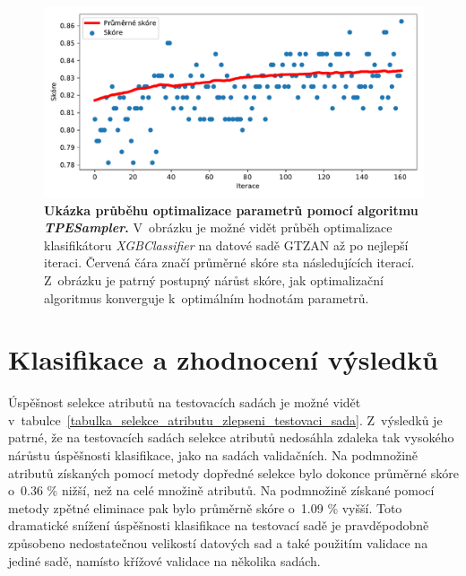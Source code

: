 \begin{figure}[h]
    \centering
    \includegraphics[width=\textwidth]{obrazky/TPESampler_optimisation.pdf}
    \caption{\textbf{Ukázka průběhu optimalizace parametrů pomocí algoritmu \textit{TPESampler}.} V~obrázku je možné vidět průběh optimalizace klasifikátoru \textit{XGBClassifier} na datové sadě GTZAN až po nejlepší iteraci. Červená čára značí průměrné skóre sta následujících iterací. Z~obrázku je patrný postupný nárůst skóre, jak optimalizační algoritmus konverguje k~optimálním hodnotám parametrů.}
    \label{obr_TPE_optimalizace}
\end{figure}

\chapter{Klasifikace a zhodnocení výsledků}
\label{klasifikace_a_zhodnoceni_vysledku}

Úspěšnost selekce atributů na testovacích sadách je možné vidět v~tabulce~\ref{tabulka_selekce_atributu_zlepseni_testovaci_sada}. Z~výsledků je patrné, že na testovacích sadách selekce atributů nedosáhla zdaleka tak vysokého nárůstu úspěšnosti klasifikace, jako na sadách validačních. Na podmnožině atributů získaných pomocí metody dopředné selekce bylo dokonce průměrné skóre o~0.36 \% nižší, než na celé množině atributů. Na podmnožině získané pomocí metody zpětné eliminace pak bylo průměrně skóre o~1.09 \% vyšší. Toto dramatické snížení úspěšnosti klasifikace na testovací sadě je pravděpodobně způsobeno nedostatečnou velikostí datových sad a také použitím validace na jediné sadě, namísto křížové validace na několika sadách. 

